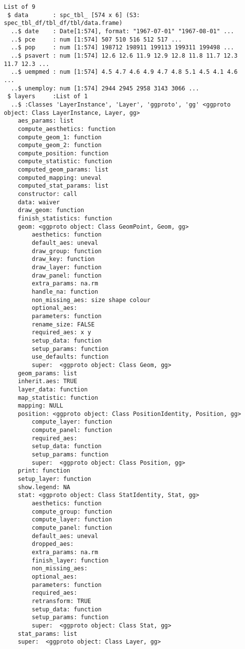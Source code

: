 \documentclass[
  letterpaper,
  DIV=11,
  numbers=noendperiod]{scrreprt}
\begin{document}
\begin{verbatim}
List of 9
 $ data       : spc_tbl_ [574 x 6] (S3: spec_tbl_df/tbl_df/tbl/data.frame)
  ..$ date    : Date[1:574], format: "1967-07-01" "1967-08-01" ...
  ..$ pce     : num [1:574] 507 510 516 512 517 ...
  ..$ pop     : num [1:574] 198712 198911 199113 199311 199498 ...
  ..$ psavert : num [1:574] 12.6 12.6 11.9 12.9 12.8 11.8 11.7 12.3 11.7 12.3 ...
  ..$ uempmed : num [1:574] 4.5 4.7 4.6 4.9 4.7 4.8 5.1 4.5 4.1 4.6 ...
  ..$ unemploy: num [1:574] 2944 2945 2958 3143 3066 ...
 $ layers     :List of 1
  ..$ :Classes 'LayerInstance', 'Layer', 'ggproto', 'gg' <ggproto object: Class LayerInstance, Layer, gg>
    aes_params: list
    compute_aesthetics: function
    compute_geom_1: function
    compute_geom_2: function
    compute_position: function
    compute_statistic: function
    computed_geom_params: list
    computed_mapping: uneval
    computed_stat_params: list
    constructor: call
    data: waiver
    draw_geom: function
    finish_statistics: function
    geom: <ggproto object: Class GeomPoint, Geom, gg>
        aesthetics: function
        default_aes: uneval
        draw_group: function
        draw_key: function
        draw_layer: function
        draw_panel: function
        extra_params: na.rm
        handle_na: function
        non_missing_aes: size shape colour
        optional_aes: 
        parameters: function
        rename_size: FALSE
        required_aes: x y
        setup_data: function
        setup_params: function
        use_defaults: function
        super:  <ggproto object: Class Geom, gg>
    geom_params: list
    inherit.aes: TRUE
    layer_data: function
    map_statistic: function
    mapping: NULL
    position: <ggproto object: Class PositionIdentity, Position, gg>
        compute_layer: function
        compute_panel: function
        required_aes: 
        setup_data: function
        setup_params: function
        super:  <ggproto object: Class Position, gg>
    print: function
    setup_layer: function
    show.legend: NA
    stat: <ggproto object: Class StatIdentity, Stat, gg>
        aesthetics: function
        compute_group: function
        compute_layer: function
        compute_panel: function
        default_aes: uneval
        dropped_aes: 
        extra_params: na.rm
        finish_layer: function
        non_missing_aes: 
        optional_aes: 
        parameters: function
        required_aes: 
        retransform: TRUE
        setup_data: function
        setup_params: function
        super:  <ggproto object: Class Stat, gg>
    stat_params: list
    super:  <ggproto object: Class Layer, gg> 

\end{verbatim}
\end{document}
